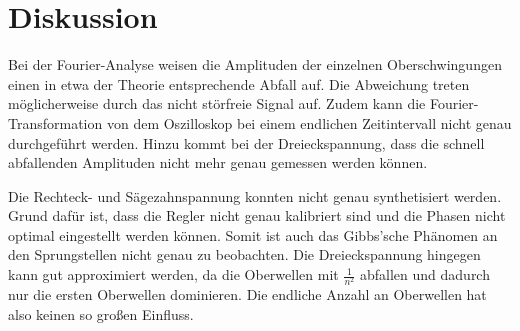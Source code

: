 \section{Diskussion}
\label{sec:Diskussion}

Bei der Fourier-Analyse weisen die Amplituden der einzelnen Oberschwingungen
einen in etwa der Theorie entsprechende Abfall auf. Die Abweichung treten
möglicherweise durch das nicht störfreie Signal auf. Zudem kann die Fourier-Transformation
von dem Oszilloskop bei einem endlichen Zeitintervall nicht genau durchgeführt werden.
Hinzu kommt bei der Dreieckspannung, dass die schnell abfallenden Amplituden nicht mehr
genau gemessen werden können.

Die Rechteck- und Sägezahnspannung konnten nicht genau synthetisiert werden.
Grund dafür ist, dass die Regler nicht genau kalibriert sind und die Phasen nicht
optimal eingestellt werden können. Somit ist auch das Gibbs'sche Phänomen an den
Sprungstellen nicht genau zu beobachten. Die Dreieckspannung hingegen kann
gut approximiert werden, da die Oberwellen mit $\frac{1}{n^2}$ abfallen und
dadurch nur die ersten Oberwellen dominieren. Die endliche Anzahl an Oberwellen
hat also keinen so großen Einfluss.
